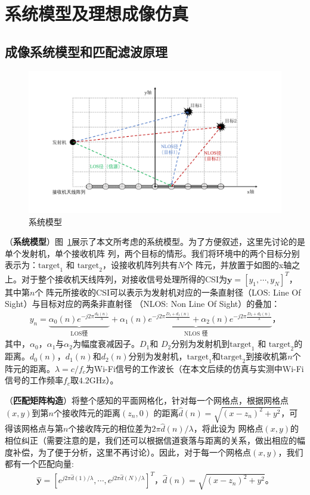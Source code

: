 \section{系统模型及理想成像仿真}
\subsection{成像系统模型和匹配滤波原理}
\begin{figure}[htb]
  \centering
  \includegraphics[width=\textwidth]{figures/system_model.pdf}
  \caption{系统模型}
  \label{系统模型}
\end{figure}
（\textbf{系统模型}）图~\ref{系统模型}展示了本文所考虑的系统模型。为了方便叙述，这里先讨论的是单个发射机，单个接收机阵
列，两个目标的情形。我们将环境中的两个目标分别表示为：$\text{target}_1$ 和 $\text{target}_2$，设接收机阵列共有$N$个
阵元，并放置于如图的x轴之上。对于整个接收机天线阵列，对接收信号处理所得的CSI为$\boldsymbol{y}=[y_1,\cdots,y_N]^T$，其中第$n$个
阵元所接收的CSI可以表示为发射机对应的一条直射径（LOS: Line Of Sight）与目标对应的两条非直射径
（NLOS: Non Line Of Sight）的叠加\cite{ma2019wifi}：
\begin{align}
  y_n = \underbrace{\alpha_0(n)e^{-j2\pi\frac{d_0(n)}{\lambda}}}_{\text{LOS径}} + \underbrace{\alpha _1(n)e^{ - j2\pi \frac{D_1 + d_1(n)}{\lambda }} + \alpha _2(n)e^{ - j2\pi \frac{D_2 + d_2(n)}{\lambda }}}_{\text{NLOS 径}}\text{，}
\end{align}
其中，$\alpha_0$，$\alpha_1$与$\alpha_2$为幅度衰减因子。$D_1$和 $D_2$分别为发射机到$\text{target}_1$ 和 $\text{target}_2$的距离。$d_0(n)$，$d_1(n)$和$d_2(n)$分别为发射机，$\text{target}_1$和$\text{target}_2$到接收机第$n$个阵元的距离。$\lambda = c/f_c$为Wi-Fi信号的工作波长（在本文后续的仿真与实测中Wi-Fi信号的工作频率$f_c$取$4.2$GHz）。


（\textbf{匹配矩阵构造}）将整个感知的平面网格化，针对每一个网格点，根据网格点$(x,y)$到第$n$个接收阵元的距离$(z_n,0)$
的距离$\hat{d}(n)=\sqrt{(x-z_n)^2+y^2}$，可得该网格点与第$n$个接收阵元的相位差为$2\pi\hat{d}(n)/\lambda$，将此设为
网格点$(x,y)$的相位纠正（需要注意的是，我们还可以根据信道衰落与距离的关系，做出相应的幅度补偿，为了便于分析，这里不再讨论）。因此，对于每一个网格点$(x,y)$，我们都有一个匹配向量:
\begin{align}
  \hat{\boldsymbol{y}}=[e^{j2\pi \hat{d}(1)/\lambda} ,\cdots,e^{j2\pi \hat{d}(N)/\lambda}]^T \text{，} \hat{d}(n)=\sqrt{(x-z_n)^2+y^2} \text{。}
  \label{matched array}
\end{align}


